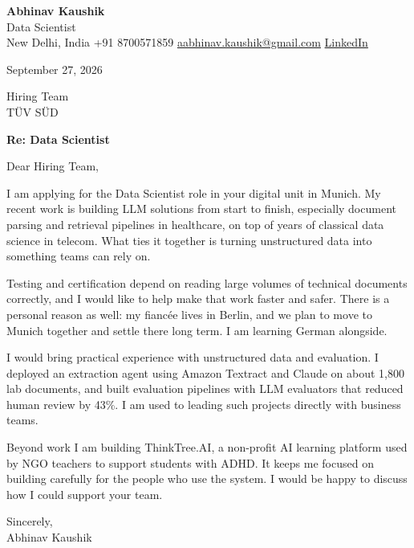 \documentclass[11pt,a4paper]{article}
\begin{document}
{\Large\bfseries Abhinav Kaushik}\\
Data Scientist\\
New Delhi, India \textbar{} +91 8700571859 \textbar{} \href{mailto:aabhinav.kaushik@gmail.com}{aabhinav.kaushik@gmail.com} \textbar{} \href{https://www.linkedin.com/in/abhinav-kaushik10/}{LinkedIn}  

September 27, 2026

Hiring Team\\
TÜV SÜD

\textbf{Re: Data Scientist}

Dear Hiring Team,

I am applying for the Data Scientist role in your digital unit in Munich. My recent work is building LLM solutions from start to finish, especially document parsing and retrieval pipelines in healthcare, on top of years of classical data science in telecom. What ties it together is turning unstructured data into something teams can rely on.

Testing and certification depend on reading large volumes of technical documents correctly, and I would like to help make that work faster and safer. There is a personal reason as well: my fiancée lives in Berlin, and we plan to move to Munich together and settle there long term. I am learning German alongside.

I would bring practical experience with unstructured data and evaluation. I deployed an extraction agent using Amazon Textract and Claude on about 1,800 lab documents, and built evaluation pipelines with LLM evaluators that reduced human review by 43\%. I am used to leading such projects directly with business teams.

Beyond work I am building ThinkTree.AI, a non-profit AI learning platform used by NGO teachers to support students with ADHD. It keeps me focused on building carefully for the people who use the system. I would be happy to discuss how I could support your team.

Sincerely,\\[4pt]
Abhinav Kaushik
\end{document}
